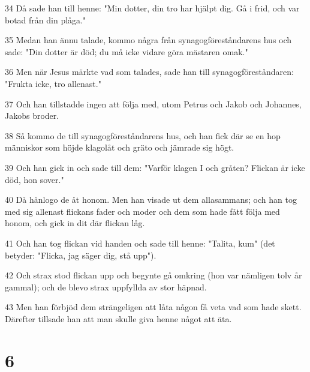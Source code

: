 \par 34 Då sade han till henne: "Min dotter, din tro har hjälpt dig. Gå i frid, och var botad från din plåga."
\par 35 Medan han ännu talade, kommo några från synagogföreståndarens hus och sade: "Din dotter är död; du må icke vidare göra mästaren omak."
\par 36 Men när Jesus märkte vad som talades, sade han till synagogföreståndaren: "Frukta icke, tro allenast."
\par 37 Och han tillstadde ingen att följa med, utom Petrus och Jakob och Johannes, Jakobs broder.
\par 38 Så kommo de till synagogföreståndarens hus, och han fick där se en hop människor som höjde klagolåt och gräto och jämrade sig högt.
\par 39 Och han gick in och sade till dem: "Varför klagen I och gråten? Flickan är icke död, hon sover."
\par 40 Då hånlogo de åt honom. Men han visade ut dem allasammans; och han tog med sig allenast flickans fader och moder och dem som hade fått följa med honom, och gick in dit där flickan låg.
\par 41 Och han tog flickan vid handen och sade till henne: "Talita, kum" (det betyder: "Flicka, jag säger dig, stå upp").
\par 42 Och strax stod flickan upp och begynte gå omkring (hon var nämligen tolv år gammal); och de blevo strax uppfyllda av stor häpnad.
\par 43 Men han förbjöd dem strängeligen att låta någon få veta vad som hade skett. Därefter tillsade han att man skulle giva henne något att äta.

\chapter{6}

